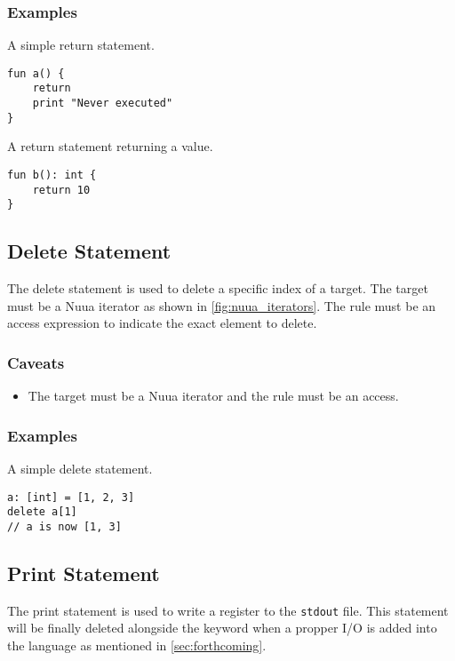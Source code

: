 \subsubsection{Examples}

A simple return statement.
\begin{verbatim}
fun a() {
    return
    print "Never executed"
}
\end{verbatim}
A return statement returning a value.
\begin{verbatim}
fun b(): int {
    return 10
}
\end{verbatim}

\subsection{Delete Statement}
\label{sec:delete_statement}

The delete statement is used to delete a specific index of a target. The target must be a Nuua iterator as shown in \autoref{fig:nuua_iterators}.
The rule must be an access expression to indicate the exact element to delete.

\subsubsection{Caveats}

\begin{itemize}
    \item The target must be a Nuua iterator and the rule must be an access.
\end{itemize}

\subsubsection{Examples}

A simple delete statement.
\begin{verbatim}
a: [int] = [1, 2, 3]
delete a[1]
// a is now [1, 3]
\end{verbatim}

\subsection{Print Statement}
\label{sec:print_statement}

The print statement is used to write a register to the \texttt{stdout} file.
This statement will be finally deleted alongside the keyword when a propper I/O is added into the language as mentioned in \autoref{sec:forthcoming}.

